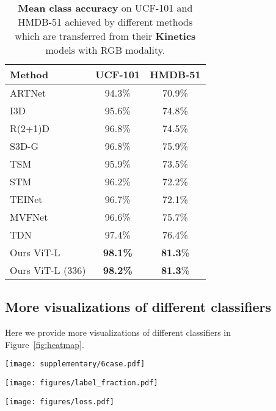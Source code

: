 \documentclass[letterpaper]{article} \usepackage{aaai23}  \usepackage{times}  \usepackage{helvet}  \usepackage{courier}  \usepackage[hyphens]{url}  \usepackage{graphicx} \urlstyle{rm} \def\UrlFont{\rm}  \usepackage{natbib}  \usepackage{caption} \frenchspacing  \setlength{\pdfpagewidth}{8.5in}  \setlength{\pdfpageheight}{11in}  \usepackage{algorithm}
\newcommand{\vs}{\textit{v}.\textit{s}.}
\begin{document}
\begin{table}[h]
\centering
\footnotesize
\begin{tabular}{lcc}
\toprule
\textbf{Method}   & \textbf{UCF-101}  & \textbf{HMDB-51} \\ \midrule

ARTNet~\cite{ARN}  & 94.3\% & 70.9\% \\  
I3D~\cite{i3d}    & 95.6\%  & 74.8\% \\ 
R(2+1)D~\cite{r2+1d}    & 96.8\%  & 74.5\% \\
S3D-G~\cite{s3d} &  96.8\%  & 75.9\% \\ 
TSM~\cite{tsm} &  95.9\%  & 73.5\%  \\
STM~\cite{stm}  &  96.2\%  & 72.2\%   \\ 
TEINet~\cite{teinet}  &  96.7\%  & 72.1\%   \\ 
MVFNet~\cite{wu2020MVFNet}  &  96.6\%  & 75.7\%  \\ 
TDN~\cite{tdn} & 97.4\% & 76.4\% \\ \midrule
Ours ViT-L & \textbf{98.1\%} & \textbf{81.3}\% \\
Ours ViT-L (336) & \textbf{98.2\%} & \textbf{81.3}\% \\
\bottomrule
\end{tabular}
\caption{\textbf{Mean class accuracy} on UCF-101 and HMDB-51 achieved by different methods which are transferred from their \textbf{Kinetics} models with RGB modality.}
\label{t:UCFHMDB}
\end{table}



\subsection{More visualizations of different classifiers}\label{sec:vis}
Here we provide more visualizations of different classifiers in Figure~\ref{fig:heatmap}.

\begin{figure*}
\begin{center}
\texttt{[image: supplementary/6case.pdf]}
\end{center}
\caption{Inter-class correlation maps of ``embeddings of class labels'' for 20 categories on Kinetics-400. The color thresholds are adjusted for better understandability. Please zoom in for best view.}
\label{fig:heatmap}
\end{figure*}

\begin{figure*}[t] 
  \begin{minipage}[]{0.48\textwidth} 
    \centering 
    \texttt{[image: figures/label\_fraction.pdf]} 
    \caption{Vision-Text \vs Vision-only framework under different label fractions on Kinetics-400.} 
    \label{fig:label fraction}
  \end{minipage}\quad 
  \begin{minipage}[]{0.48\textwidth} 
    \centering 
    \texttt{[image: figures/loss.pdf]} 
    \caption{The training loss of Vision-Text and Vision-only framework on Kinetics-400.} 
    \label{fig:loss}
  \end{minipage}
\end{figure*}
\end{document}
